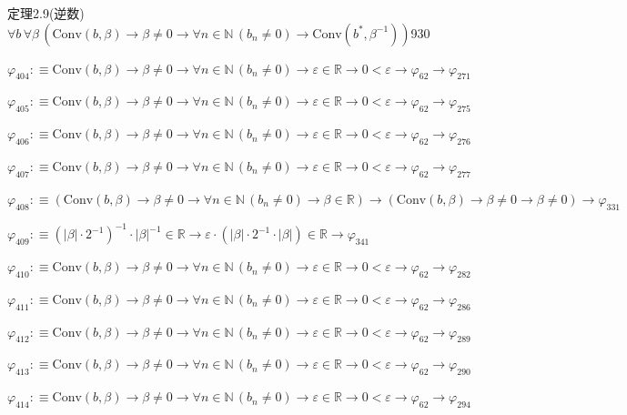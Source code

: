 \begin{fullproof}{定理2.9(逆数)}{$\forall b\,\forall \beta\,(\mathrm{Conv}(b,\beta) \to \beta \neq 0 \to \forall n \in \mathbb{N}\,(b_{n} \neq 0) \to \mathrm{Conv}(b^{\ast},\beta^{-1}))$}{930}
\begin{abbrevlist}
\item $\varphi_{404} :\equiv \mathrm{Conv}(b,\beta) \to \beta \neq 0 \to \forall n \in \mathbb{N}\,(b_{n} \neq 0) \to \varepsilon \in \mathbb{R} \to 0 < \varepsilon \to \varphi_{62} \to \varphi_{271}$
\item $\varphi_{405} :\equiv \mathrm{Conv}(b,\beta) \to \beta \neq 0 \to \forall n \in \mathbb{N}\,(b_{n} \neq 0) \to \varepsilon \in \mathbb{R} \to 0 < \varepsilon \to \varphi_{62} \to \varphi_{275}$
\item $\varphi_{406} :\equiv \mathrm{Conv}(b,\beta) \to \beta \neq 0 \to \forall n \in \mathbb{N}\,(b_{n} \neq 0) \to \varepsilon \in \mathbb{R} \to 0 < \varepsilon \to \varphi_{62} \to \varphi_{276}$
\item $\varphi_{407} :\equiv \mathrm{Conv}(b,\beta) \to \beta \neq 0 \to \forall n \in \mathbb{N}\,(b_{n} \neq 0) \to \varepsilon \in \mathbb{R} \to 0 < \varepsilon \to \varphi_{62} \to \varphi_{277}$
\item $\varphi_{408} :\equiv (\mathrm{Conv}(b,\beta) \to \beta \neq 0 \to \forall n \in \mathbb{N}\,(b_{n} \neq 0) \to \beta \in \mathbb{R}) \to (\mathrm{Conv}(b,\beta) \to \beta \neq 0 \to \beta \neq 0) \to \varphi_{331}$
\item $\varphi_{409} :\equiv (\lvert \beta \rvert \cdot 2^{-1})^{-1} \cdot \lvert \beta \rvert^{-1} \in \mathbb{R} \to \varepsilon \cdot (\lvert \beta \rvert \cdot 2^{-1} \cdot \lvert \beta \rvert) \in \mathbb{R} \to \varphi_{341}$
\item $\varphi_{410} :\equiv \mathrm{Conv}(b,\beta) \to \beta \neq 0 \to \forall n \in \mathbb{N}\,(b_{n} \neq 0) \to \varepsilon \in \mathbb{R} \to 0 < \varepsilon \to \varphi_{62} \to \varphi_{282}$
\item $\varphi_{411} :\equiv \mathrm{Conv}(b,\beta) \to \beta \neq 0 \to \forall n \in \mathbb{N}\,(b_{n} \neq 0) \to \varepsilon \in \mathbb{R} \to 0 < \varepsilon \to \varphi_{62} \to \varphi_{286}$
\item $\varphi_{412} :\equiv \mathrm{Conv}(b,\beta) \to \beta \neq 0 \to \forall n \in \mathbb{N}\,(b_{n} \neq 0) \to \varepsilon \in \mathbb{R} \to 0 < \varepsilon \to \varphi_{62} \to \varphi_{289}$
\item $\varphi_{413} :\equiv \mathrm{Conv}(b,\beta) \to \beta \neq 0 \to \forall n \in \mathbb{N}\,(b_{n} \neq 0) \to \varepsilon \in \mathbb{R} \to 0 < \varepsilon \to \varphi_{62} \to \varphi_{290}$
\item $\varphi_{414} :\equiv \mathrm{Conv}(b,\beta) \to \beta \neq 0 \to \forall n \in \mathbb{N}\,(b_{n} \neq 0) \to \varepsilon \in \mathbb{R} \to 0 < \varepsilon \to \varphi_{62} \to \varphi_{294}$

\end{abbrevlist}
\end{fullproof}
